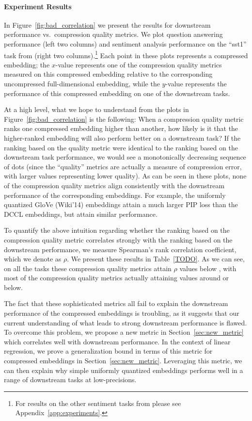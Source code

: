 \paragraph{Experiment Results}
In Figure~\ref{fig:bad_correlation} we present the results for downstream performance vs.\ compression quality metrics.
We plot question answering performance (left two columns) and sentiment analysis performance on the ``sst1'' task from \citet{kim14} (right two columns).\footnote{For results on the other sentiment tasks from \citet{kim14} please see Appendix~\ref{app:experiments}.}
Each point in these plots represents a compressed embedding;
the $x$-value represents one of the compression quality metrics measured on this compressed embedding relative to the corresponding uncompressed full-dimensional embedding, while the $y$-value represents the performance of this compressed embedding on one of the downstream tasks.

At a high level, what we hope to understand from the plots in Figure~\ref{fig:bad_correlation} is the following:
When a compression quality metric ranks one compressed embedding higher than another, how likely is it that the higher-ranked embedding will also perform better on a downstream task?
If the ranking based on the quality metric were identical to the ranking based on the downstream task performance, we would see a monotonically decreasing sequence of dots (since the ``quality'' metrics are actually a measure of compression error, with larger values representing lower quality).
As can be seen in these plots, none of the compression quality metrics align consistently with the downstream performance of the corresponding embeddings.
For example, the uniformly quantized GloVe (Wiki'14) embeddings attain a much larger PIP loss than the DCCL embeddings, but attain similar performance.

To quantify the above intuition regarding whether the ranking based on the compression quality metric correlates strongly with the ranking based on the downstream performance, we measure Spearman's rank correlation coefficient, which we denote as $\rho$.
We present these results in Table~\ref{TODO}.
As we can see, on all the tasks these compression quality metrics attain $\rho$ values below , with most of the compression quality metrics actually attaining values around  or below.

The fact that these sophisticated metrics all fail to explain the downstream performance of the compressed embeddings is troubling, as it suggests that our current understanding of what leads to strong downstream performance is flawed.
To overcome this problem, we propose a new metric in Section~\ref{sec:new_metric} which correlates well with downstream performance. In the context of linear regression, we prove a generalization bound in terms of this metric for compressed embeddings in Section~\ref{sec:new_metric}.
Leveraging this metric, we can then explain why simple uniformly quantized embeddings performs well in a range of downstream tasks at low-precisions.


